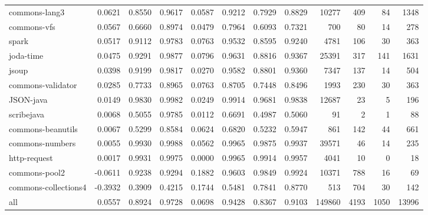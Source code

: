 \begin{table*}
\begin{tabular}{lrrrrrrrrrrr}
          commons-lang3 &      0.0621 &  0.8550 &     0.9617 &     0.0587 &  0.9212 &     0.7929 &   0.8829 &   10277 &   409 &    84 &   1348 \\
            commons-vfs &      0.0567 &  0.6660 &     0.8974 &     0.0479 &  0.7964 &     0.6093 &   0.7321 &     700 &    80 &    14 &    278 \\
                  spark &      0.0517 &  0.9112 &     0.9783 &     0.0763 &  0.9532 &     0.8595 &   0.9240 &    4781 &   106 &    30 &    363 \\
              joda-time &      0.0475 &  0.9291 &     0.9877 &     0.0796 &  0.9631 &     0.8816 &   0.9367 &   25391 &   317 &   141 &   1631 \\
                  jsoup &      0.0398 &  0.9199 &     0.9817 &     0.0270 &  0.9582 &     0.8801 &   0.9360 &    7347 &   137 &    14 &    504 \\
      commons-validator &      0.0285 &  0.7733 &     0.8965 &     0.0763 &  0.8705 &     0.7448 &   0.8496 &    1993 &   230 &    30 &    363 \\
              JSON-java &      0.0149 &  0.9830 &     0.9982 &     0.0249 &  0.9914 &     0.9681 &   0.9838 &   12687 &    23 &     5 &    196 \\
             scribejava &      0.0068 &  0.5055 &     0.9785 &     0.0112 &  0.6691 &     0.4987 &   0.5060 &      91 &     2 &     1 &     88 \\
      commons-beanutils &      0.0067 &  0.5299 &     0.8584 &     0.0624 &  0.6820 &     0.5232 &   0.5947 &     861 &   142 &    44 &    661 \\
        commons-numbers &      0.0055 &  0.9930 &     0.9988 &     0.0562 &  0.9965 &     0.9875 &   0.9937 &   39571 &    46 &    14 &    235 \\
           http-request &      0.0017 &  0.9931 &     0.9975 &     0.0000 &  0.9965 &     0.9914 &   0.9957 &    4041 &    10 &     0 &     18 \\
          commons-pool2 &     -0.0611 &  0.9238 &     0.9294 &     0.1882 &  0.9603 &     0.9849 &   0.9924 &   10371 &   788 &    16 &     69 \\
   commons-collections4 &     -0.3932 &  0.3909 &     0.4215 &     0.1744 &  0.5481 &     0.7841 &   0.8770 &     513 &   704 &    30 &    142 \\
                    all &      0.0557 &  0.8924 &     0.9728 &     0.0698 &  0.9428 &     0.8367 &   0.9103 &  149860 &  4193 &  1050 &  13996 \\
\bottomrule
\end{tabular}
\end{table*}
